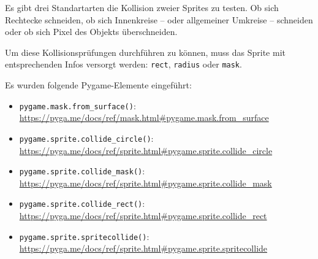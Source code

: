 Es gibt drei Standartarten die Kollision zweier Sprites zu testen. Ob sich Rechtecke schneiden, ob sich Innenkreise -- oder allgemeiner Umkreise -- schneiden oder ob sich Pixel des Objekts überschneiden. 

Um diese Kollisionsprüfungen durchführen zu können, muss das Sprite mit entsprechenden Infos versorgt werden: \texttt{rect}, \texttt{radius} oder \texttt{mask}.

Es wurden folgende Pygame-Elemente eingeführt:
\begin{itemize}
	\item \texttt{pygame.mask.from\_surface()}:
	\\ 
    \url{https://pyga.me/docs/ref/mask.html#pygame.mask.from_surface}
	
	\item \texttt{pygame.sprite.collide\_circle()}:
	\\ 
    \url{https://pyga.me/docs/ref/sprite.html#pygame.sprite.collide_circle}

	\item \texttt{pygame.sprite.collide\_mask()}:
	\\ 
    \url{https://pyga.me/docs/ref/sprite.html#pygame.sprite.collide_mask}

	\item \texttt{pygame.sprite.collide\_rect()}:
	\\ 
    \url{https://pyga.me/docs/ref/sprite.html#pygame.sprite.collide_rect}
	
	\item \texttt{pygame.sprite.spritecollide()}:
	\\ 
    \url{https://pyga.me/docs/ref/sprite.html#pygame.sprite.spritecollide}
	
\end{itemize}

